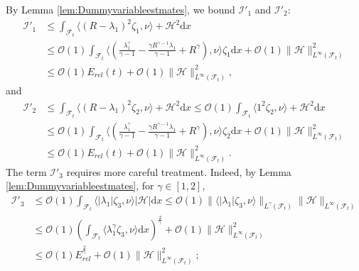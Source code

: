 \documentclass[11pt,twoside,reqno]{amsart}
\numberwithin{equation}{section}
\numberwithin{figure}{section}
\newcommand{\qnt}[1]{\left(#1\right)}
\begin{document}
By Lemma \ref{lem:Dummyvariableestmates}, we bound \(\mathcal{I}'_1\) and \(\mathcal{I}'_2\):
\begin{equation}\label{eq:II1}
    \begin{aligned}
        \mathcal{I}'_1&\leq \int_{\mathcal{F}_t}\langle(R-\lambda_1)^2\zeta_1,\nu\rangle +\mathcal{H}^2 \mathrm{d}x \\&\leq \mathcal{O}(1)\int_{\mathcal{F}_t}\langle\qnt{\frac{\lambda_1^\gamma}{\gamma-1}-\frac{\gamma R^{\gamma-1}\lambda_1}{\gamma-1}+R^\gamma},\nu\rangle\zeta_1\mathrm{d}x+\mathcal{O}(1)\|\mathcal{H}\|^2_{L^\infty(\mathcal{F}_t)}\\&\leq \mathcal{O}(1)E_{rel}(t)+\mathcal{O}(1)\|\mathcal{H}\|^2_{L^\infty(\mathcal{F}_t)},
    \end{aligned}
\end{equation}
and 
\begin{equation}\label{eq:II2}
    \begin{aligned}
        \mathcal{I}'_2&\leq \int_{\mathcal{F}_t}\langle(R-\lambda_1)^2\zeta_2,\nu\rangle +\mathcal{H}^2 \mathrm{d}x \leq \mathcal{O}(1)\int_{\mathcal{F}_t}\langle 1^2\zeta_2,\nu\rangle+\mathcal{H}^2\mathrm{d}x\\&\leq \mathcal{O}(1)\int_{\mathcal{F}_t}\langle\qnt{\frac{\lambda_1^\gamma}{\gamma-1}-\frac{\gamma R^{\gamma-1}\lambda_1}{\gamma-1}+R^\gamma},\nu\rangle\zeta_2\mathrm{d}x+\mathcal{O}(1)\|\mathcal{H}\|^2_{L^\infty(\mathcal{F}_t)}\\&\leq \mathcal{O}(1)E_{rel}(t)+\mathcal{O}(1)\|\mathcal{H}\|^2_{L^\infty(\mathcal{F}_t)}.
    \end{aligned}
\end{equation}
The term $\mathcal{I}'_3$ requires more careful treatment. Indeed, by Lemma \ref{lem:Dummyvariableestmates}, for $\gamma \in \left[1, 2\right]$,
\begin{equation}\label{eq:II3}
    \begin{aligned}
        \mathcal{I}'_3&\leq\mathcal{O}(1)\int_{\mathcal{F}_t}\langle|\lambda_1|\zeta_3,\nu\rangle\big|\mathcal{H}\big|\mathrm{d}x\leq\mathcal{O}(1)\|\langle|\lambda_1|\zeta_3,\nu\rangle\|_{L^{\gamma}(\mathcal{F}_t)}\|\mathcal{H}\|_{L^\infty(\mathcal{F}_t)}\\&\leq \mathcal{O}(1) \qnt{\int_{\mathcal{F}_t}\langle\lambda^\gamma_1\zeta_3,\nu\rangle\mathrm{d}x }^{\frac{2}{\gamma}}+\mathcal{O}(1)\|\mathcal{H}\|^2_{L^\infty(\mathcal{F}_t)}\\&\leq \mathcal{O}(1)E_{rel}^{\frac{2}{\gamma}}+\mathcal{O}(1)\|\mathcal{H}\|^2_{L^\infty(\mathcal{F}_t)};
    \end{aligned}
\end{equation}
\end{document}
